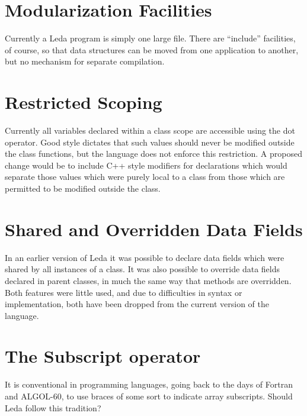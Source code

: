 \section{Modularization Facilities}

Currently a Leda program is simply one large file.  There are ``include''
facilities, of course, so that data structures can be moved from one
application to another, but no mechanism for separate compilation.

\section{Restricted Scoping}

Currently all variables declared within a class scope are accessible
using the dot operator.  Good style dictates that such values
should never be modified outside the class functions, but the
language does not enforce this restriction.  A proposed change
would be to include C++ style modifiers for declarations which would
separate those values which were purely local to a class from those
which are permitted to be modified outside the class.

\section{Shared and Overridden Data Fields}

In an earlier version of Leda it was possible to declare data fields which
were shared by all instances of a class.  It was also possible to
override data fields declared in parent classes, in much the same
way that methods are overridden.  Both features were little used,
and due to difficulties in syntax or implementation, both have been
dropped from the current version of the language.

\section{The Subscript operator}

It is conventional in programming languages, going back to the days of
Fortran and ALGOL-60, to use braces of some sort to indicate
array subscripts.  Should Leda follow this tradition?

